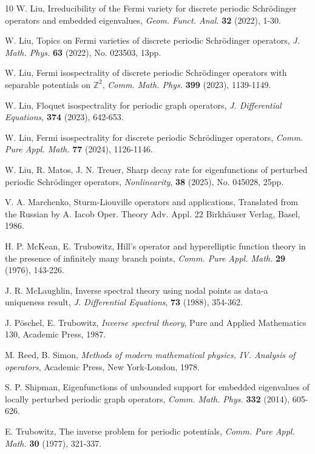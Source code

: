 \documentclass[12pt,letterpaper]{amsart}
\begin{document}
\begin{thebibliography}{10}
 W. Liu,
Irreducibility of the Fermi variety for discrete periodic Schr\"{o}dinger operators and embedded eigenvalues,
\emph{Geom. Funct. Anal.} \textbf{32} (2022), 1-30.

 W. Liu,
Topics on Fermi varieties of discrete periodic Schr\"{o}dinger operators,
\emph{J. Math. Phys.} \textbf{63} (2022), No. 023503, 13pp.

 W. Liu,
Fermi isospectrality of discrete periodic Schr\"{o}dinger operators with separable potentials on \(\mathbb{Z}^2\),
\emph{Comm. Math. Phys.} \textbf{399} (2023), 1139-1149.

 W. Liu,
Floquet isospectrality for periodic graph operators,
\emph{J. Differential Equations}, \textbf{374} (2023), 642-653.

 W. Liu,
Fermi isospectrality for discrete periodic Schr\"{o}dinger operators,
\emph{Comm. Pure Appl. Math.} \textbf{77} (2024), 1126-1146.

 W. Liu, R. Matos, J. N. Treuer,
Sharp decay rate for eigenfunctions of perturbed periodic Schr\"{o}dinger operators,
\emph{Nonlinearity}, \textbf{38} (2025), No. 045028, 25pp.

V. A. Marchenko,
Sturm-Liouville operators and applications,
Translated from the Russian by A. Iacob
Oper. Theory Adv. Appl. 22
Birkhäuser Verlag, Basel, 1986. 

 H. P. McKean, E. Trubowitz, Hill's operator and hyperelliptic function theory
in the presence of infinitely many branch points, \emph{Comm. Pure Appl. Math.} \textbf{29} (1976), 143-226.

 J. R. McLaughlin, Inverse spectral theory using nodal points as data-a uniqueness result,
{\it J. Differential Equations}, {\bf 73} (1988), 354-362.


 J. P\"{o}schel, E. Trubowitz, \emph{Inverse spectral theory},
Pure and Applied Mathematics 130, Academic Press, 1987.

 M. Reed, B. Simon, \emph{Methods of modern mathematical physics, IV.
	Analysis of operators}, Academic Press, New York-London, 1978.

 S. P. Shipman,
Eigenfunctions of unbounded support for embedded eigenvalues of locally perturbed periodic graph operators,
\emph{Comm. Math. Phys.} \textbf{332} (2014), 605-626.

 E. Trubowitz, The inverse problem for periodic potentials,
\emph{Comm. Pure Appl. Math.} \textbf{30} (1977), 321-337.


\end{thebibliography}
\end{document}

